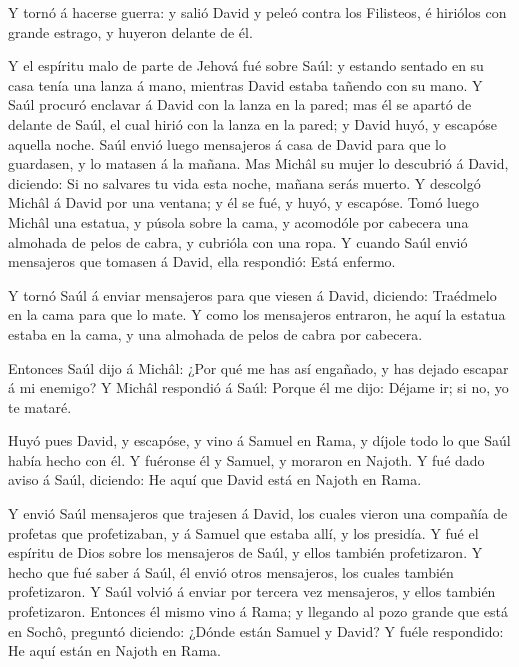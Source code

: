  Y tornó á hacerse guerra: y salió David y peleó contra los
Filisteos, é hiriólos con grande estrago, y huyeron delante de él.

 Y el espíritu malo de parte de Jehová fué sobre Saúl: y
estando sentado en su casa tenía una lanza á mano, mientras David estaba
tañendo con su mano.  Y Saúl procuró enclavar á David con
la lanza en la pared; mas él se apartó de delante de Saúl, el cual hirió
con la lanza en la pared; y David huyó, y escapóse aquella noche.
 Saúl envió luego mensajeros á casa de David para que lo
guardasen, y lo matasen á la mañana. Mas Michâl su mujer lo descubrió á
David, diciendo: Si no salvares tu vida esta noche, mañana serás muerto.
 Y descolgó Michâl á David por una ventana; y él se fué, y
huyó, y escapóse.  Tomó luego Michâl una estatua, y púsola
sobre la cama, y acomodóle por cabecera una almohada de pelos de cabra,
y cubrióla con una ropa.  Y cuando Saúl envió mensajeros
que tomasen á David, ella respondió: Está enfermo.

 Y tornó Saúl á enviar mensajeros para que viesen á David,
diciendo: Traédmelo en la cama para que lo mate.  Y como
los mensajeros entraron, he aquí la estatua estaba en la cama, y una
almohada de pelos de cabra por cabecera.

 Entonces Saúl dijo á Michâl: ¿Por qué me has así engañado,
y has dejado escapar á mi enemigo? Y Michâl respondió á Saúl: Porque él
me dijo: Déjame ir; si no, yo te mataré.

 Huyó pues David, y escapóse, y vino á Samuel en Rama, y
díjole todo lo que Saúl había hecho con él. Y fuéronse él y Samuel, y
moraron en Najoth.  Y fué dado aviso á Saúl, diciendo: He
aquí que David está en Najoth en Rama.

 Y envió Saúl mensajeros que trajesen á David, los cuales
vieron una compañía de profetas que profetizaban, y á Samuel que estaba
allí, y los presidía. Y fué el espíritu de Dios sobre los mensajeros de
Saúl, y ellos también profetizaron.  Y hecho que fué saber
á Saúl, él envió otros mensajeros, los cuales también profetizaron. Y
Saúl volvió á enviar por tercera vez mensajeros, y ellos también
profetizaron.  Entonces él mismo vino á Rama; y llegando al
pozo grande que está en Sochô, preguntó diciendo: ¿Dónde están Samuel y
David? Y fuéle respondido: He aquí están en Najoth en Rama.

